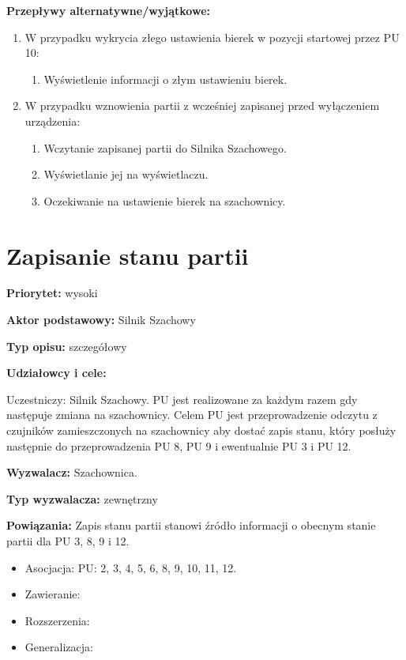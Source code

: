 \documentclass[12pt]{article}
\begin{document}
\textbf{Przepływy alternatywne/wyjątkowe:}
\begin{enumerate}
    \item W przypadku wykrycia złego ustawienia bierek w pozycji startowej przez PU 10:
    \begin{enumerate}
        \item Wyświetlenie informacji o złym ustawieniu bierek.
    \end{enumerate}
    \item W przypadku wznowienia partii z wcześniej zapisanej przed wyłączeniem urządzenia:
    \begin{enumerate}
        \item Wczytanie zapisanej partii do Silnika Szachowego.
        \item Wyświetlanie jej na wyświetlaczu.
        \item Oczekiwanie na ustawienie bierek na szachownicy.
    \end{enumerate}
\end{enumerate}



\section{Zapisanie stanu partii}

\textbf{Priorytet:} wysoki

\textbf{Aktor podstawowy:} Silnik Szachowy

\textbf{Typ opisu:} szczegółowy

\textbf{Udziałowcy i cele:} 

Uczestniczy: Silnik Szachowy. PU jest realizowane za każdym razem gdy następuje zmiana na szachownicy. Celem PU jest przeprowadzenie odczytu z czujników zamieszczonych na szachownicy aby dostać zapis stanu, który posłuży następnie do przeprowadzenia PU 8, PU 9 i ewentualnie PU 3 i PU 12. 

\textbf{Wyzwalacz:} Szachownica.

\textbf{Typ wyzwalacza:} zewnętrzny

\textbf{Powiązania:} Zapis stanu partii stanowi źródło informacji o obecnym stanie partii dla PU 3, 8, 9 i 12.
	\begin{itemize}\item Asocjacja: PU: 2, 3, 4, 5, 6, 8, 9, 10, 11, 12.
	\item Zawieranie: 
	\item Rozszerzenia:
	\item Generalizacja:
\end{itemize} 
\end{document}
